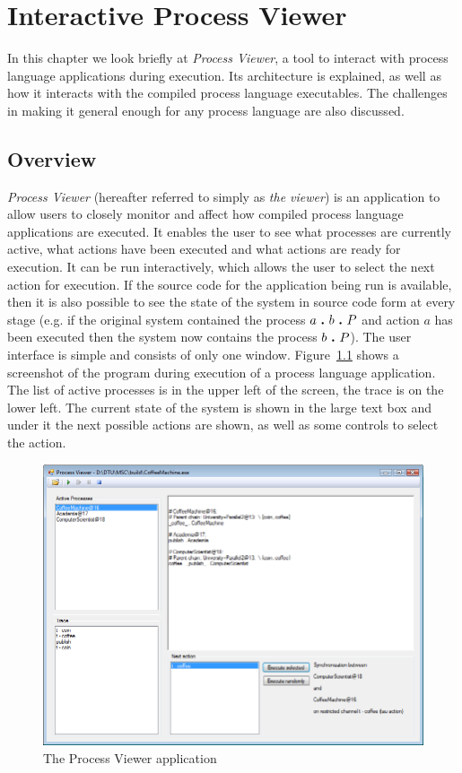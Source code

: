 \chapter{Interactive Process Viewer}\label{ch:process_viewer}

	In this chapter we look briefly at \textit{Process Viewer}, a tool to interact
	with process language applications during execution. Its architecture is 
	explained, as well as how it interacts with the compiled process language 
	executables. The challenges in making it general enough for any process
	language are also discussed.

\section{Overview}

	\textit{Process Viewer} (hereafter referred to simply as \textit{the viewer})
	is an application to allow users to closely monitor and affect how compiled 
	process language applications are executed. It enables the user to see what 
	processes are currently active, what actions have been executed and what 
	actions are ready for execution. It can be run interactively, which allows 
	the user to select the next action for execution. If the source code for the 
	application being run is available, then it is also possible to see the 
	state of the system in source code form at every stage (e.g. if the original 
	system contained the process $a \ \textbf{.}\  b \ \textbf{.}\  P$ and action $a$ has been 
	executed then the system now contains the process $b \ \textbf{.}\  P$). The user 
	interface is simple and consists of only one window. 
	Figure~\ref{fig:process_viewer} shows a screenshot of the program during 
	execution of a process language application. The list of active processes is 
	in the upper left of the screen, the trace is on the lower left. The current 
	state of the system is shown in the large text box and under it the next 
	possible actions are shown, as well as some controls to select the action.
	
	\begin{figure}[h!]
		\centering
		\includegraphics[scale=0.4]{process_viewer.png}
		\caption{The Process Viewer application}
		\label{fig:process_viewer}
	\end{figure}
	

